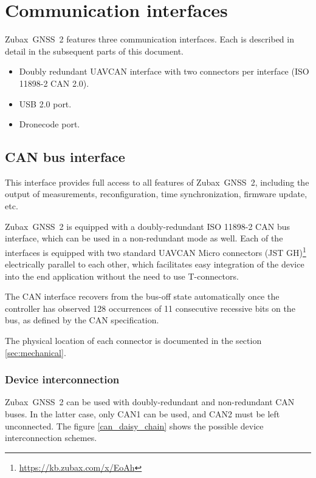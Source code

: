 \documentclass{zubaxdoc}
\begin{document}
\section{Communication interfaces}

Zubax~GNSS~2 features three communication interfaces.
Each is described in detail in the subsequent parts of this document.
\begin {itemize}
    \item Doubly redundant UAVCAN interface with two connectors per interface (ISO 11898-2 CAN 2.0).
    \item USB 2.0 port.
    \item Dronecode port.
\end{itemize}

\subsection{CAN bus interface}

This interface provides full access to all features of Zubax~GNSS~2, including the output of measurements,
reconfiguration, time synchronization, firmware update, etc.

Zubax~GNSS~2 is equipped with a doubly-redundant ISO 11898-2 CAN bus interface,
which can be used in a non-redundant mode as well.
Each of the interfaces is equipped with two standard
UAVCAN Micro connectors (JST GH)\footnote{\url{https://kb.zubax.com/x/EoAh}}
electrically parallel to each other,
which facilitates easy integration of the device into the end application without the need to use T-connectors.

The CAN interface recovers from the bus-off state automatically once the controller has
observed 128 occurrences of 11 consecutive recessive bits on the bus, as defined by the CAN specification.

The physical location of each connector is documented in the section \ref{sec:mechanical}.

\subsubsection{Device interconnection}

Zubax~GNSS~2 can be used with doubly-redundant and non-redundant CAN buses.
In the latter case, only CAN1 can be used, and CAN2 must be left unconnected.
The figure \ref{can_daisy_chain} shows the possible device interconnection schemes.
\end{document}
